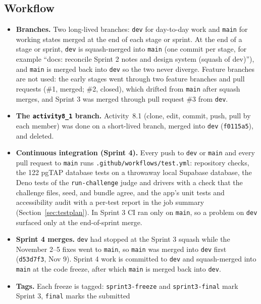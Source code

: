 \documentclass[12pt,letterpaper]{article}
\begin{document}
\subsection{Workflow}
\begin{itemize}
  \item \textbf{Branches.} Two long-lived branches: \texttt{dev} for day-to-day work
        and \texttt{main} for working states merged at the end of each stage or sprint. At the end of a stage or sprint,
        \texttt{dev} is squash-merged into \texttt{main} (one commit per stage, for
        example ``docs: reconcile Sprint 2 notes and design system (squash of dev)''), and \texttt{main} is merged
        back into \texttt{dev} so the two never diverge. Feature branches are not used:
        the early stages went through two feature branches and pull requests (\#1,
        merged; \#2, closed), which drifted from \texttt{main} after squash merges, and
        Sprint 3 was merged through pull request \#3 from \texttt{dev}.
  \item \textbf{The \texttt{activity8\_1} branch.} Activity~8.1 (clone, edit,
        commit, push, pull by each member) was done on a short-lived branch, merged
        into \texttt{dev} (\texttt{f0115a5}), and deleted.
  \item \textbf{Continuous integration (Sprint 4).} Every push to \texttt{dev} or
        \texttt{main} and every pull request to \texttt{main} runs
        \texttt{.github/workflows/test.yml}: repository checks, the 122 pgTAP database
        tests on a throwaway local Supabase database, the Deno tests of the
        \texttt{run-challenge} judge and drivers with a check that the challenge files,
        seed, and bundle agree, and the app's unit tests and
        accessibility audit with a per-test report in the job summary
        (Section~\ref{sec:testplan}). In Sprint 3 CI ran only on \texttt{main}, so a
        problem on \texttt{dev} surfaced only at the end-of-sprint merge.
  \item \textbf{Sprint 4 merges.} \texttt{dev} had stopped at the Sprint 3 squash
        while the November 2--5 fixes went to \texttt{main}, so \texttt{main} was
        merged into \texttt{dev} first (\texttt{d53d7f3}, Nov 9). Sprint 4 work is
        committed to \texttt{dev} and squash-merged into \texttt{main} at the code
        freeze, after which \texttt{main} is merged back into \texttt{dev}.
  \item \textbf{Tags.} Each freeze is tagged: \texttt{sprint3-freeze} and
        \texttt{sprint3-final} mark Sprint 3, \texttt{final} marks the submitted

\end{itemize}
\end{document}
